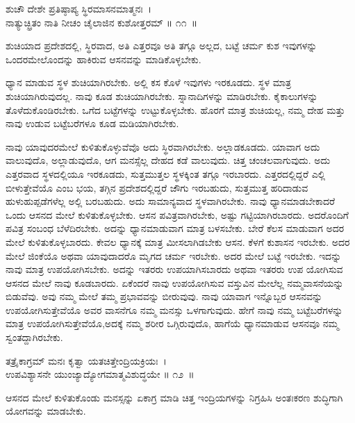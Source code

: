 \begin{shloka}
ಶುಚೌ ದೇಶೇ ಪ್ರತಿಷ್ಠಾಪ್ಯ ಸ್ಥಿರಮಾಸನಮಾತ್ಮನಃ~।\\ನಾತ್ಯುಚ್ಛ್ರಿತಂ ನಾತಿ ನೀಚಂ ಚೈಲಾಜಿನ ಕುಶೋತ್ತರಮ್ \hfill॥ ೧೧~॥
\end{shloka}

\begin{artha}
ಶುಚಿಯಾದ ಪ್ರದೇಶದಲ್ಲಿ, ಸ್ಥಿರವಾದ, ಅತಿ ಎತ್ತರವೂ ಅತಿ ತಗ್ಗೂ ಅಲ್ಲದ, ಬಟ್ಟೆ ಚರ್ಮ ಕುಶ ಇವುಗಳನ್ನು ಒಂದರಮೇಲೊಂದನ್ನು ಹಾಕಿರುವ ಆಸನವನ್ನು ಮಾಡಿಕೊಳ್ಳಬೇಕು.
\end{artha}

ಧ್ಯಾನ ಮಾಡುವ ಸ್ಥಳ ಶುಚಿಯಾಗಿರಬೇಕು. ಅಲ್ಲಿ ಕಸ ಕೊಳೆ ಇವುಗಳು ಇರಕೂಡದು. ಸ್ಥಳ ಮಾತ್ರ ಶುಚಿಯಾಗಿರುವುದಲ್ಲ. ನಾವು ಕೂಡ ಶುಚಿಯಾಗಿರಬೇಕು. ಸ್ನಾನಾದಿಗಳನ್ನು ಮಾಡಿರಬೇಕು. ಕೈಕಾಲುಗಳನ್ನು ತೊಳೆದುಕೊಂಡಿರಬೇಕು. ಒಗೆದ ಬಟ್ಟೆಗಳನ್ನು ಉಟ್ಟುಕೊಳ್ಳಬೇಕು. ಹೊರಗೆ ಮಾತ್ರ ಶುಚಿಯಲ್ಲ, ನಮ್ಮ ದೇಹ ಮತ್ತು ನಾವು ಉಡುವ ಬಟ್ಟೆಬರೆಗಳೂ ಕೂಡ ಮಡಿಯಾಗಿರಬೇಕು.

ನಾವು ಯಾವುದರಮೇಲೆ ಕುಳಿತುಕೊಳ್ಳುವೆವೊ ಅದು ಸ್ಥಿರವಾಗಿರಬೇಕು. ಅಲ್ಲಾಡಕೂಡದು. ಯಾವಾಗ ಅದು ವಾಲುವುದೊ, ಅಲ್ಲಾಡುವುದೊ, ಆಗ ಮನಸ್ಸೆಲ್ಲ ದೇಹದ ಕಡೆ ವಾಲುವುದು. ಚಿತ್ತ ಚಂಚಲವಾಗುವುದು. ಅದು ಎತ್ತರವಾದ ಸ್ಥಳದಲ್ಲಿಯೂ ಇರಕೂಡದು, ಸುತ್ತಮುತ್ತಲ ಸ್ಥಳಕ್ಕಿಂತ ತಗ್ಗೂ ಇರಬಾರದು. ಎತ್ತರದಲ್ಲಿದ್ದರೆ ಎಲ್ಲಿ ಬೀಳುತ್ತೇವೆಯೊ ಎಂಬ ಭಯ, ತಗ್ಗಿನ ಪ್ರದೇಶದಲ್ಲಿದ್ದರೆ ಜೌಗು ಇರಬಹುದು, ಸುತ್ತಮುತ್ತ ಹರಿದಾಡುವ ಹುಳುಹುಪ್ಪಡೆಗಳೆಲ್ಲ ಅಲ್ಲಿ ಬರಬಹುದು. ಅದು ಸಾಮಾನ್ಯವಾದ ಸ್ಥಳವಾಗಿರಬೇಕು. ನಾವು ಧ್ಯಾನಮಾಡಬೇಕಾದರೆ ಒಂದು ಆಸನದ ಮೇಲೆ ಕುಳಿತುಕೊಳ್ಳಬೇಕು. ಆಸನ ಪವಿತ್ರವಾಗಿರಬೇಕು, ಅಷ್ಟು ಗಟ್ಟಿಯಾಗಿರಬಾರದು. ಅದರೊಂದಿಗೆ ಪವಿತ್ರ ಸಂಬಂಧ ಬೆಳೆದಿರಬೇಕು. ಅದನ್ನು ಧ್ಯಾನಮಾಡುವಾಗ ಮಾತ್ರ ಬಳಸಬೇಕು. ಬೇರೆ ಕೆಲಸ ಮಾಡುವಾಗ ಅದರ ಮೇಲೆ ಕುಳಿತುಕೊಳ್ಳಬಾರದು. ಕೇವಲ ಧ್ಯಾನಕ್ಕೆ ಮಾತ್ರ ಮೀಸಲಾಗಿಡಬೇಕು ಆಸನ. ಕೆಳಗೆ ಕುಶಾಸನ ಇರಬೇಕು. ಅದರ ಮೇಲೆ ಜಿಂಕೆಯೊ ಅಥವಾ ಯಾವುದಾದರೊ ಮೃಗದ ಚರ್ಮ ಇರಬೇಕು. ಅದರ ಮೇಲೆ ಬಟ್ಟೆ ಇರಬೇಕು. ಇದನ್ನು ನಾವು ಮಾತ್ರ ಉಪಯೋಗಿಸಬೇಕು. ಅದನ್ನು ಇತರರು ಉಪಯಾಗಿಸಬಾರದು ಅಥವಾ ಇತರರು ಉಪ ಯೋಗಿಸುವ ಆಸನದ ಮೇಲೆ ನಾವು ಕೂಡಬಾರದು. ಏಕೆಂದರೆ ನಾವು ಉಪಯೋಗಿಸುವ ವಸ್ತುವಿನ ಮೇಲೆಲ್ಲ ನಮ್ಮವಾಸನೆಯನ್ನು ಬಿಡುವೆವು. ಅವು ನಮ್ಮ ಮೇಲೆ ತಮ್ಮ ಪ್ರಭಾವವನ್ನು ಬೀರುವುವು. ನಾವು ಯಾವಾಗ ಇನ್ನೊಬ್ಬರ ಆಸನವನ್ನು ಉಪಯೋಗಿಸುತ್ತೇವೆಯೊ ಅವರ ವಾಸನೆಗೂ ನಮ್ಮ ಮನಸ್ಸು ಒಳಗಾಗುವುದು. ಹೇಗೆ ನಾವು ನಮ್ಮ ಬಟ್ಟೆಬರೆಗಳನ್ನು ಮಾತ್ರ ಉಪಯೋಗಿಸುತ್ತೇವೆಯೊ,ಅದಕ್ಕೆ ನಮ್ಮ ಶರೀರ ಒಗ್ಗಿರುವುದೊ, ಹಾಗೆಯೆ ಧ್ಯಾನಮಾಡುವ ಆಸನವೂ ನಮ್ಮ ಸ್ವಂತದ್ದಾಗಿರಬೇಕು.

\begin{shloka}
ತತ್ರೈಕಾಗ್ರಮ್ ಮನಃ ಕೃತ್ವಾ ಯತಚಿತ್ತೇಂದ್ರಿಯಕ್ರಿಯಃ~।\\ಉಪವಿಶ್ಯಾಸನೇ ಯುಂಜ್ಯಾದ್ಯೋಗಮಾತ್ಮವಿಶುದ್ಧಯೇ \hfill॥ ೧೨~॥
\end{shloka}

\begin{artha}
ಆಸನದ ಮೇಲೆ ಕುಳಿತುಕೊಂಡು ಮನಸ್ಸನ್ನು ಏಕಾಗ್ರ ಮಾಡಿ ಚಿತ್ತ ಇಂದ್ರಿಯಗಳನ್ನು ನಿಗ್ರಹಿಸಿ ಅಂತಃಕರಣ ಶುದ್ಧಿಗಾಗಿ ಯೋಗವನ್ನು ಮಾಡಬೇಕು.
\end{artha}

